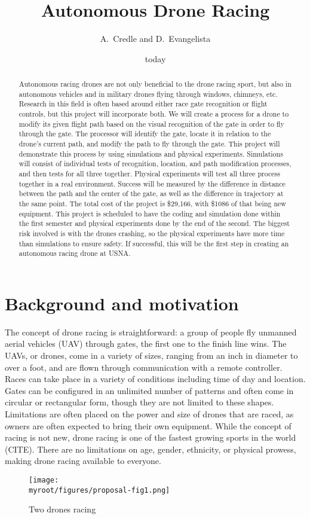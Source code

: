 \documentclass[onecolumn,10pt]{IEEEtran}
\title{Autonomous Drone Racing}
\author{A.~Credle and D.~Evangelista}
\date{today}
\newcommand{\myroot}{../}
\begin{document}
\maketitle

\begin{abstract}
Autonomous racing drones are not only beneficial to the drone racing sport, but also in autonomous vehicles and in military drones flying through windows, chimneys, etc. Research in this field is often based around either race gate recognition or flight controls, but this project will incorporate both. We will create a process for a drone to modify its given flight path based on the visual recognition of the gate in order to fly through the gate. The processor will identify the gate, locate it in relation to the drone’s current path, and modify the path to fly through the gate. This project will demonstrate this process by using simulations and physical experiments. Simulations will consist of individual tests of recognition, location, and path modification processes, and then tests for all three together. Physical experiments will test all three process together in a real environment. Success will be measured by the difference in distance between the path and the center of the gate, as well as the difference in trajectory at the same point. The total cost of the project is \$29,166, with \$1086 of that being new equipment. This project is scheduled to have the coding and simulation done within the first semester and physical experiments done by the end of the second. The biggest risk involved is with the drones crashing, so the physical experiments have more time than simulations to ensure safety. If successful, this will be the first step in creating an autonomous racing drone at USNA.
\end{abstract}

\section{Background and motivation}
The concept of drone racing is straightforward: a group of people fly unmanned aerial vehicles (UAV) through gates, the first one to the finish line wins. The UAVs, or drones, come in a variety of sizes, ranging from an inch in diameter to over a foot, and are flown through communication with a remote controller. Races can take place in a variety of conditions including time of day and location. Gates can be configured in an unlimited number of patterns and often come in circular or rectangular form, though they are not limited to these shapes. Limitations are often placed on the power and size of drones that are raced, as owners are often expected to bring their own equipment. While the concept of racing is not new, drone racing is one of the fastest growing sports in the world (CITE). There are no limitations on age, gender, ethnicity, or physical prowess, making drone racing available to everyone.
\begin{figure}
\begin{center}
\texttt{[image: \\myroot/figures/proposal-fig1.png]}
\end{center}
\caption{Two drones racing}
\label{fig:1}
\end{figure}
\end{document}
